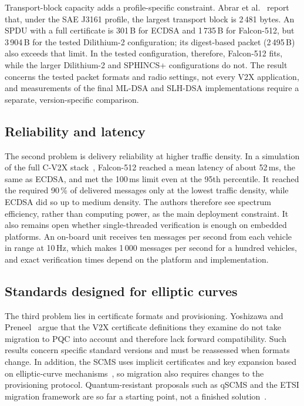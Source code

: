 \documentclass[11pt,a4paper]{article}
\begin{document}
Transport-block capacity adds a profile-specific constraint. Abrar et al.~\cite{abrar} report
that, under the SAE J3161 profile, the largest transport block is 2\,481 bytes. An SPDU with a
full certificate is 301\,B for ECDSA and 1\,735\,B for Falcon-512, but 3\,904\,B for the tested
Dilithium-2 configuration; its digest-based packet (2\,495\,B) also exceeds that limit. In the
tested configuration, therefore, Falcon-512 fits, while the larger Dilithium-2 and SPHINCS+
configurations do not. The result concerns the tested packet formats and radio settings, not
every V2X application, and measurements of the final ML-DSA and SLH-DSA implementations require
a separate, version-specific comparison.

\subsection{Reliability and latency}

The second problem is delivery reliability at higher traffic density. In a simulation of the
full C-V2X stack~\cite{abrar}, Falcon-512 reached a mean latency of about 52\,ms, the same as
ECDSA, and met the 100\,ms limit even at the 95th percentile. It reached the required 90\,\% of
delivered messages only at the lowest traffic density, while ECDSA did so up to medium density.
The authors therefore see spectrum efficiency, rather than computing power, as the main
deployment constraint. It also remains open whether single-threaded verification is enough on
embedded platforms. An on-board unit receives ten messages per second from each vehicle in range
at 10\,Hz, which makes 1\,000 messages per second for a hundred vehicles, and exact verification
times depend on the platform and implementation.

\subsection{Standards designed for elliptic curves}

The third problem lies in certificate formats and provisioning. Yoshizawa and
Preneel~\cite{yoshizawa23} argue that the V2X certificate definitions they examine do not take
migration to PQC into account and therefore lack forward compatibility. Such results concern
specific standard versions and must be reassessed when formats change. In addition, the SCMS
uses implicit certificates and key expansion based on elliptic-curve mechanisms~\cite{whyte}, so
migration also requires changes to the provisioning protocol. Quantum-resistant proposals such as
qSCMS and the ETSI migration framework are so far a starting point, not a finished
solution~\cite{barreto,etsi619}.
\end{document}
